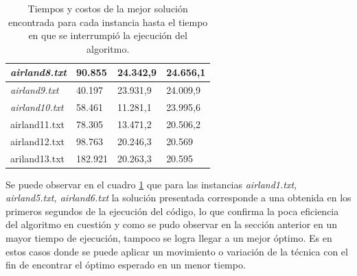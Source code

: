 \documentclass[letter, 10pt]{article}
\begin{document}
\begin{table}[h]
\begin{tabular}{|l|l|l|l|}
    \textit{airland8.txt}     & 90.855                   & 24.342,9                                                                                     & 24.656,1                                                                                   \\ \hline
    \textit{airland9.txt}     & 40.197                   & 23.931,9                                                                                     & 24.009,9                                                                                   \\ \hline
    \textit{airland10.txt}    & 58.461                   & 11.281,1                                                                                     & 23.995,6                                                                                   \\ \hline
    airland11.txt             & 78.305                   & 13.471,2                                                                                     & 20.506,2                                                                                   \\ \hline
    airland12.txt             & 98.763                   & 20.246,3                                                                                     & 20.569                                                                                     \\ \hline
    ariland13.txt             & 182.921                  & 20.263,3                                                                                     & 20.595                                                                                     \\ \hline
    \end{tabular}
    \caption{Tiempos y costos de la mejor solución encontrada para cada instancia hasta el tiempo en que se interrumpió la ejecución del algoritmo.}
    \label{tablaSolucion1}
    \end{table}
    
Se puede observar en el cuadro \ref{tablaSolucion1} que para las instancias \textit{airland1.txt, airland5.txt, airland6.txt} la solución presentada corresponde a una obtenida en los primeros segundos de la ejecución del código, lo que confirma la poca eficiencia del algoritmo en cuestión y como se pudo observar en la sección anterior en un mayor tiempo de ejecución, tampoco se logra llegar a un mejor óptimo. Es en estos casos donde se puede aplicar un movimiento o variación de la técnica con el fin de encontrar el óptimo esperado en un menor tiempo.
\end{document}
